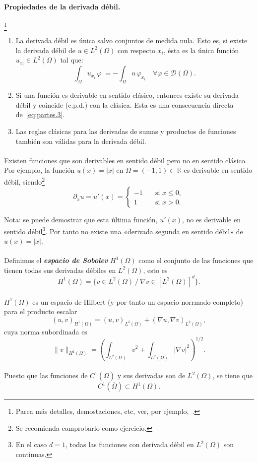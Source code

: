\documentclass[11pt]{article}
\theoremstyle{plain}
\theoremstyle{definition}
\newcounter{stepnum}[section]
\newcommand{\step}[1][]{\bigskip\noindent\textbf{\thesection.\refstepcounter{stepnum}\thestepnum}.\enspace{#1}}
\renewcommand{\step}[1][]{\paragraph{#1}\hspace{-1.1em}}
\newcommand{\deff}[1]{\textit{\textbf{#1}}}
\newcommand{\R}{\ensuremath{\mathbb{R}}}
\newcommand{\grad}{\ensuremath{\nabla}}
\newcommand{\norm}[2][]{\ensuremath{\|#2\|_{#1}}}
\newcommand{\TestSpace}{\ensuremath{\mathcal{D}}}
\begin{document}
\step[\textbf{Propiedades} de la derivada débil.]%
%
\footnote{Parea más detalles, demostaciones, etc, ver, por ejemplo,~\cite{adams2003sobolev}.}
%
\begin{enumerate}
  \item La derivada débil es única salvo conjuntos de medida nula. Esto es, si existe la derivada débil de $u\in L^2(\Omega)$ con respecto  $x_i$, ésta es la única función $u_{x_i}\in L^2(\Omega)$ tal que: 
\[
  \int_\Omega u_{x_i} \, \varphi\; = -\int_\Omega u\, \varphi_{x_i} \quad \forall \varphi \in \TestSpace(\Omega).
\]
\item Si una función es derivable en sentido clásico, entonces existe su derivada débil y coincide (c.p.d.) con la clásica. Esta es una consecuencia directa de~\eqref{eq:partes.3}. 
  \item  Las reglas clásicas para las derivadas de sumas y productos de funciones también son válidas para la derivada débil.
\end{enumerate}

\step
Existen funciones que son derivables en sentido débil pero no en sentido clásico. Por ejemplo, la función $u(x)=|x|$ en $\Omega=(-1,1)\subset\R$ es derivable en sentido débil, siendo\footnote{Se recomienda comprobarlo como ejercicio.} 
    \[
      \partial_x u =u'(x)=  \left\{\begin{aligned}-1 & \quad\text{si } x\le 0,\\ 1 &\quad\text{si } x>0. \end{aligned}\right.
    \]

    Nota: se puede demostrar que esta última función, $u'(x)$, no es derivable en sentido débil\footnote{En el caso $d=1$, todas las funciones con derivada débil en $L^2(\Omega)$ son continuas.}. Por tanto no existe una «derivada segunda en sentido débil» de $u(x)=|x|$. 

\step
Definimos el \deff{espacio de Sobolev} $H^1(\Omega)$ como el conjunto de las funciones que tienen todas sus derivadas débiles en $L^2(\Omega)$, esto es
\[
  H^1(\Omega) = \big\{v\in L^2(\Omega) \ /\ \grad v \in [L^2(\Omega)]^d \big\}.
\]

\step 
$H^1(\Omega)$ es un espacio de Hilbert (y por tanto un espacio norrmado completo) para el producto escalar
\[
  (u,v)_{H^1(\Omega)} = (u,v)_{L^2(\Omega)} + (\grad u, \grad v)_{L^2(\Omega)},
\]
cuya norma subordinada es
\[
  \norm[H^1(\Omega)]{v} = \left(\int_{L^2(\Omega)}v^2 +
  \int_{L^2(\Omega)} |\grad v|^2\right)^{1/2}.
\]
\step Puesto que las funciones de $C^1(\overline\Omega)$ y sus derivadas son de $L^2(\Omega)$, se tiene que   
\[
C^1(\overline\Omega) \subset H^1(\Omega).
\]
\end{document}
